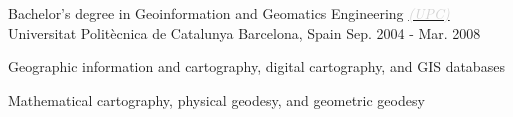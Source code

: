 \begin{cventries}

  \cventry
    {Bachelor’s degree in Geoinformation and Geomatics Engineering \href{https://epseb.upc.edu/en/studies/bachelor-s-degree-in-geoinformation-and-geomatics-engineering}{\textit{\textcolor{lightgray}{(UPC)}}}} %
    {Universitat Politècnica de Catalunya} %
    {Barcelona, Spain} %
    {Sep. 2004 - Mar. 2008}
    {
        \begin{cvitems} %
            \item {Geographic information and cartography, digital cartography, and GIS databases}
            \item {Mathematical cartography, physical geodesy, and geometric geodesy}
        \end{cvitems}
    }


\end{cventries}
